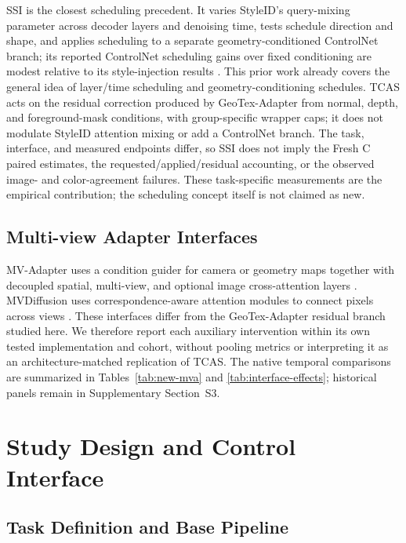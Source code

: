 \documentclass[times,twocolumn,final]{elsarticle}
\begin{document}
SSI is the closest scheduling precedent. It varies StyleID's query-mixing parameter across decoder layers and denoising time, tests schedule direction and shape, and applies scheduling to a separate geometry-conditioned ControlNet branch; its reported ControlNet scheduling gains over fixed conditioning are modest relative to its style-injection results \cite{kulkarni2026ssi}. This prior work already covers the general idea of layer/time scheduling and geometry-conditioning schedules. TCAS acts on the residual correction produced by GeoTex-Adapter from normal, depth, and foreground-mask conditions, with group-specific wrapper caps; it does not modulate StyleID attention mixing or add a ControlNet branch. The task, interface, and measured endpoints differ, so SSI does not imply the Fresh C paired estimates, the requested/applied/residual accounting, or the observed image- and color-agreement failures. These task-specific measurements are the empirical contribution; the scheduling concept itself is not claimed as new.

\subsection{Multi-view Adapter Interfaces}
\label{subsec:mvinterfaces}

MV-Adapter uses a condition guider for camera or geometry maps together with decoupled spatial, multi-view, and optional image cross-attention layers \cite{huang2024mvadapter}. MVDiffusion uses correspondence-aware attention modules to connect pixels across views \cite{tang2023mvdiffusion}. These interfaces differ from the GeoTex-Adapter residual branch studied here. We therefore report each auxiliary intervention within its own tested implementation and cohort, without pooling metrics or interpreting it as an architecture-matched replication of TCAS. The native temporal comparisons are summarized in Tables~\ref{tab:new-mva} and \ref{tab:interface-effects}; historical panels remain in Supplementary Section~S3.

\section{Study Design and Control Interface}
\label{sec:method}

\subsection{Task Definition and Base Pipeline}
\label{subsec:task}
\end{document}
